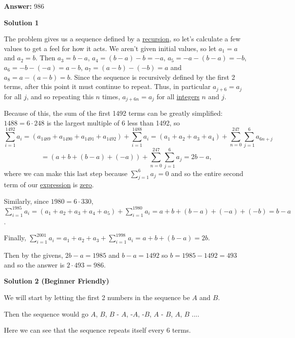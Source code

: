 \begin{enumerate}
 
 \textbf{Answer: }986



\textbf{Solution 1}

The problem gives us a sequence defined by a \href{https://artofproblemsolving.com/wiki/index.php?title=Recursion}{recursion}, so let's calculate a few values to get a feel for how it acts.  We aren't given initial values, so let $a_1 = a$ and $a_2 = b$.  Then $a_3 = b - a$, $a_4 = (b - a) - b = -a$, $a_5 = -a - (b - a) = -b$, $a_6 = -b - (-a) = a - b$, $a_7 = (a - b) - (-b) = a$ and $a_8 = a - (a - b) = b$.  Since the sequence is recursively defined by the first 2 terms, after this point it must continue to repeat.  Thus, in particular $a_{j + 6} = a_j$ for all $j$, and so repeating this $n$ times, $a_{j + 6n} = a_j$ for all \href{https://artofproblemsolving.com/wiki/index.php?title=Integer}{integers} $n$ and $j$.  

 Because of this, the sum of the first 1492 terms can be greatly simplified: $1488 = 6 \cdot 248$ is the largest multiple of 6 less than 1492, so 
 \[\sum_{i = 1}^{1492} a_i = (a_{1489} + a_{1490} + a_{1491} + a_{1492})+ \sum_{i = 1}^{1488} a_i = (a_1 + a_2 + a_3 + a_4) + \sum_{n = 0}^{247}\sum_{j = 1}^6 a_{6n + j}\]
 \[=(a + b + (b - a) + (-a)) + \sum_{n = 0}^{247}\sum_{j = 1}^6 a_j = 2b - a,\]where we can make this last step because $\sum_{j = 1}^6 a_j = 0$ and so the entire second term of our \href{https://artofproblemsolving.com/wiki/index.php?title=Expression}{expression} is \href{https://artofproblemsolving.com/wiki/index.php?title=0}{zero}.

 Similarly, since $1980 = 6 \cdot 330$, $\sum_{i = 1}^{1985} a_i = (a_1 + a_2 + a_3 + a_4 + a_5) + \sum_{i = 1}^{1980}a_i = a + b + (b - a) + (-a) + (-b) = b - a$.

 Finally, $\sum_{i = 1}^{2001}a_i = a_1 + a_2 + a_3 + \sum_{i = 1}^{1998} a_i = a + b + (b - a) = 2b$.

 Then by the givens, $2b - a = 1985$ and $b - a = 1492$ so $b = 1985 - 1492 = 493$ and so the answer is $2\cdot 493 = \boxed{986}$.

 



\textbf{Solution 2 (Beginner Friendly)}

We will start by letting the first 2 numbers in the sequence be $A$ and $B$. 

 Then the sequence would go $A$, $B$, $B$ - $A$, -$A$, -$B$, $A$ - $B$, $A$, $B$ $....$

 Here we can see that the sequence repeats itself every 6 terms.


\end{enumerate}
